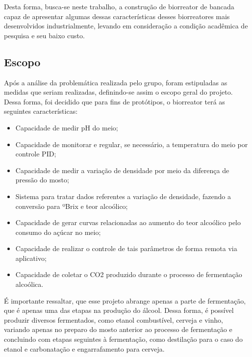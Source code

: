 Desta forma, busca-se neste trabalho, a construção de biorreator de bancada capaz de apresentar algumas dessas características desses biorreatores mais desenvolvidos industrialmente, levando em consideração a condição acadêmica de pesquisa e seu baixo custo.

\subsection{Escopo}

Após a análise da problemática realizada pelo grupo, foram estipuladas as medidas que seriam realizadas, definindo-se assim o escopo geral do projeto. Dessa forma, foi decidido que para fins de protótipos, o biorreator terá as seguintes características:

\begin{itemize}
\item Capacidade de medir pH do meio;
\item Capacidade de monitorar e regular, se necessário, a temperatura do meio por controle PID;
\item Capacidade de medir a variação de densidade por meio da diferença de pressão do mosto;
\item Sistema para tratar dados referentes a variação de densidade, fazendo a  conversão para ºBrix e teor alcoólico;
\item Capacidade de gerar curvas relacionadas ao aumento do teor alcoólico pelo consumo do açúcar no meio;
\item Capacidade de realizar o controle de tais parâmetros de forma remota via aplicativo;
\item Capacidade de coletar o CO2 produzido durante o processo de fermentação alcoólica.
\end{itemize}

É importante ressaltar, que esse projeto abrange apenas a parte de fermentação, que é apenas uma das etapas na produção do álcool. Dessa forma, é possível produzir diversos fermentados, como etanol combustível, cerveja e vinho, variando apenas no preparo do mosto anterior ao processo de fermentação e concluindo com etapas seguintes à fermentação, como destilação para o caso do etanol e carbonatação e engarrafamento para cerveja.
